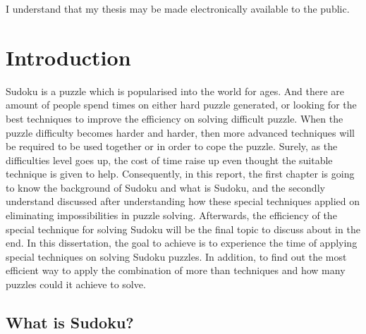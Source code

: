 \documentclass[11pt]{report}
\begin{document}
I understand that my thesis may be made electronically available to the public.
\tableofcontents



\chapter{Introduction}
\label{cha:Introduction}


Sudoku is a puzzle which is popularised into the world for ages. And there are amount of people spend times on either hard puzzle generated, or looking for the best techniques to improve the efficiency on solving difficult puzzle.
When the puzzle difficulty becomes harder and harder, then more advanced techniques will be required to be used together or in order to cope the puzzle. Surely, as the difficulties level goes up, the cost of time raise up even thought the suitable technique is given to help. Consequently, in this report, the first chapter is going to know the background of Sudoku and what is Sudoku, and the secondly understand discussed after understanding how these special techniques applied on eliminating impossibilities in puzzle solving. Afterwards, the efficiency of the special technique for solving Sudoku will be the final topic to discuss about in the end.
In this dissertation, the goal to achieve is to experience the time of applying special techniques on solving Sudoku puzzles. In addition, to find out the most efficient way to apply the combination of more than techniques and how many puzzles could it achieve to solve.


\section{What is Sudoku?}
\label{sec:whatissudoku}
\end{document}
